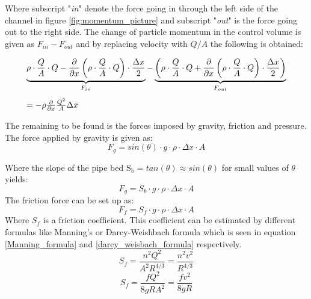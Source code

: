 Where subscript "\textit{in}" denote the force going in through the left side of the channel in figure \ref{fig:momentum_picture} and subscript "\textit{out}" is the force going out to the right side.%
The change of particle momentum in the control volume is given as $F_{in}- F_{out}$ and by replacing velocity with $Q/A$ the following is obtained:

\begin{equation}\label{mass_flow_speed}
\begin{array}{l}
\underbrace{\rho \cdot \frac{Q}{A} \cdot Q - \frac{\partial}{\partial x}\left(\rho \cdot \frac{Q}{A}  \cdot Q\right) \cdot \frac{\Delta x}{2}}_{F_{in}} - %
\underbrace{\left(\rho \cdot \frac{Q}{A}  \cdot Q + \frac{\partial}{\partial x}\left(\rho \cdot \frac{Q}{A}  \cdot Q\right) \cdot \frac{\Delta x}{2} \right)}_{F_{out}} \vspace{3mm}\\ 
= -  \rho\frac{\partial}{\partial x} \frac{Q^2}{A}\Delta x
\end{array}
\end{equation}

The remaining to be found is the forces imposed by gravity, friction and pressure.
The force applied by gravity is given as:
\begin{equation}
F_g = sin(\theta)\cdot g \cdot \rho \cdot \Delta x \cdot A
\label{gravity_force} 
\end{equation}

Where the slope of the pipe bed $\text{S}_\text{b} = tan(\theta) \approx sin(\theta)$ for small values of $\theta$ yields:
\begin{equation}
F_g = S_b \cdot g \cdot \rho \cdot \Delta x \cdot A 
\end{equation}
The friction force can be set up as:
\begin{equation}
F_f = S_f \cdot g \cdot \rho \cdot \Delta x \cdot A 
\label{friction_force} 
\end{equation}
Where $S_f$ is a friction coefficient. This coefficient can be estimated by different formulas like Manning's or Darcy-Weishbach formula which is seen in equation \ref{Manning_formula} and \ref{darcy_weisbach_formula} respectively. 
\begin{equation}
	S_f = \frac{n^2 Q^2}{A^2R^{4/3}}= \frac{n^2 v^2}{R^{4/3}}
\label{Manning_formula}
\end{equation}
\begin{equation}
	S_f = \frac{f Q^2}{8gR A^2}= \frac{f v^2}{8gR}
\label{darcy_weisbach_formula}
\end{equation}

